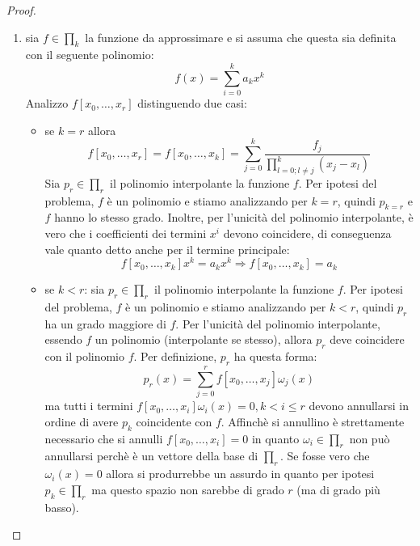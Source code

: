 \begin{proof}
\begin{enumerate}
  \item sia $f \in \prod_{k}$ la funzione da approssimare e si assuma che
  questa sia definita con il seguente polinomio:
  \begin{displaymath}
  	f(x) = \sum_{i = 0}^{k}{a_{k}x^{k}}
  \end{displaymath}
  Analizzo $f[x_{0}, \ldots, x_{r}]$ distinguendo due casi:
  \begin{itemize}
    \item se $k = r$ allora 
    \begin{displaymath}
    	f[x_{0}, \ldots, x_{r}] = f[x_{0}, \ldots, x_{k}] = 
    	\sum_{j = 0}^{k}{
  		\frac{f_{j}}{\prod_{l = 0;l \not = j}^{k}{(x_{j} - x_{l})}}}
    \end{displaymath}
    Sia $p_{r}\in \prod_{r}$ il polinomio interpolante la funzione
    $f$. Per ipotesi del problema, $f$ \`e un polinomio e stiamo analizzando
    per $k = r$, quindi $p_{k = r}$ e $f$ hanno lo stesso grado. Inoltre, per
    l'unicit\`a del polinomio interpolante, \`e vero che i coefficienti dei
    termini $x^{i}$ devono coincidere, di conseguenza vale quanto detto anche
    per il termine principale:
    \begin{displaymath}
    	f[x_{0}, \ldots, x_{k}] x^{k} = 
  		a_{k}x^{k} \Rightarrow f[x_{0}, \ldots, x_{k}] = a_{k} 
    \end{displaymath}
    
    \item se $k < r$: 
    sia $p_{r}\in \prod_{r}$ il polinomio interpolante la funzione $f$.
    Per ipotesi del problema, $f$ \`e un polinomio e stiamo analizzando
    per $k < r$, quindi $p_{r}$ ha un grado maggiore di $f$. 
    Per l'unicit\`a del polinomio interpolante, essendo $f$ un
    polinomio (interpolante se stesso), allora $p_{r}$ deve coincidere con il 
    polinomio $f$. Per definizione, $p_{r}$ ha questa forma:
    \begin{displaymath}
    	p_{r}(x) = \sum_{j = 0}^{r}{f[x_{0}, \ldots, x_{j}] \omega_{j}(x)}
    \end{displaymath}
    ma tutti i termini $f[x_{0}, \ldots, x_{i}] \omega_{i}(x) = 0, k < i \leq r$
    devono annullarsi in ordine di avere $p_{k}$ coincidente con $f$. Affinch\`e
    si annullino \`e strettamente necessario che si annulli $f[x_{0}, \ldots,
    x_{i}] = 0$ in quanto $\omega_{i} \in \prod_{r}$ non pu\`o annullarsi
    perch\`e \`e un vettore della base di $\prod_{r}$. Se fosse vero che
    $\omega_{i}(x) = 0$ allora si produrrebbe un assurdo in quanto per ipotesi 
    $p_{k} \in \prod_{r}$ ma questo spazio non sarebbe di grado $r$ (ma di grado pi\`u
    basso).
  \end{itemize}
  

\end{enumerate}
\end{proof}
